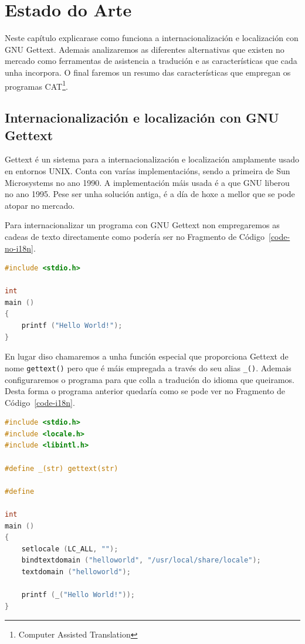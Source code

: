 \chapter{Estado do Arte}

Neste capítulo explicarase como funciona a internacionalización e localización con GNU Gettext. Ademais analizaremos as diferentes alternativas que existen no mercado como ferramentas de asistencia a tradución e as características que cada unha incorpora. O final faremos un resumo das características que empregan os programas CAT\footnote{Computer Assisted Translation}.

\section{Internacionalización e localización con GNU Gettext}
Gettext é un sistema para a internacionalización e localización amplamente usado en entornos UNIX. Conta con varías implementacións, sendo a primeira de Sun Microsystems no ano 1990. A implementación máis usada é a que GNU liberou no ano 1995. Pese ser unha solución antiga, é a día de hoxe a mellor que se pode atopar no mercado.

Para internacionalizar un programa con GNU Gettext non empregaremos as cadeas de texto directamente como podería ser no Fragmento de Código~\ref{code-no-i18n}.

\begin{lstlisting}[language=C,label=code-no-i18n,caption=helloworld.c (Sen Internacionalizar)]
#include <stdio.h>

int
main ()
{
    printf ("Hello World!");
}
\end{lstlisting}

En lugar diso chamaremos a unha función especial que proporciona Gettext de nome \lstinline{gettext()} pero que é máis empregada a través do seu alias \lstinline{_()}. Ademais configuraremos o programa para que colla a tradución do idioma que queiramos. Desta forma o programa anterior quedaría como se pode ver no Fragmento de Código~\ref{code-i18n}.

\begin{lstlisting}[language=C,label=code-i18n,caption=helloworld.c]
#include <stdio.h>
#include <locale.h>
#include <libintl.h>

#define _(str) gettext(str)

#define

int
main ()
{
    setlocale (LC_ALL, "");
    bindtextdomain ("helloworld", "/usr/local/share/locale");
    textdomain ("helloworld");

    printf (_("Hello World!"));
}
\end{lstlisting}

